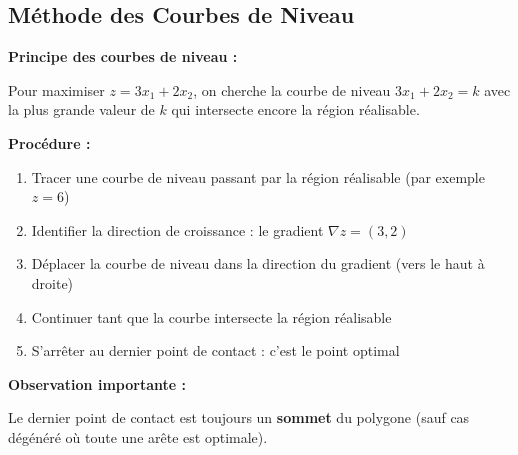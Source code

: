 \documentclass[12pt,a4paper]{article}
\begin{document}
\begin{solution}
\begin{center}
\end{center}
\end{solution}

\newpage
\subsection{Méthode des Courbes de Niveau}

\begin{methode}
\textbf{Principe des courbes de niveau :}

Pour maximiser $z = 3x_1 + 2x_2$, on cherche la courbe de niveau $3x_1 + 2x_2 = k$ avec la plus grande valeur de $k$ qui intersecte encore la région réalisable.

\textbf{Procédure :}
\begin{enumerate}
    \item \textcolor{titrebleu}{Tracer une courbe de niveau} passant par la région réalisable (par exemple $z = 6$)
    
    \item \textcolor{defvert}{Identifier la direction de croissance} : le gradient $\nabla z = (3, 2)$
    
    \item \textcolor{algoviolet}{Déplacer la courbe de niveau} dans la direction du gradient (vers le haut à droite)
    
    \item \textcolor{exempleorange}{Continuer} tant que la courbe intersecte la région réalisable
    
    \item \textcolor{importantrouge}{S'arrêter} au dernier point de contact : c'est le point optimal
\end{enumerate}

\textbf{Observation importante :}

Le dernier point de contact est toujours un \textcolor{importantrouge}{\textbf{sommet}} du polygone (sauf cas dégénéré où toute une arête est optimale).
\end{methode}
\end{document}
